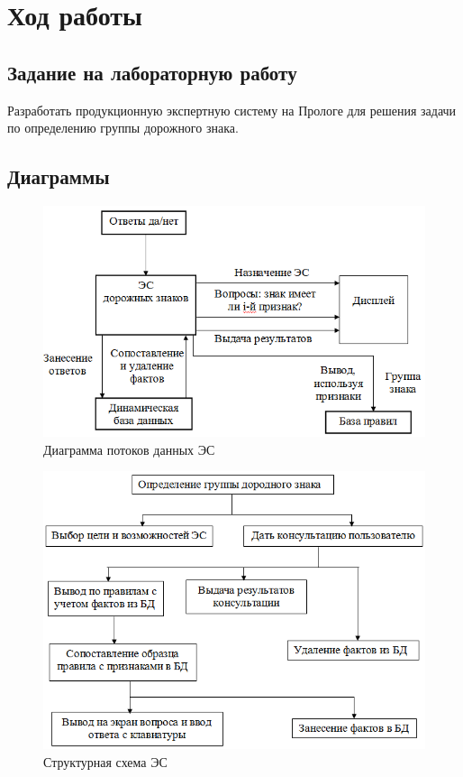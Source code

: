 \chapter{Ход работы}

\section{Задание на лабораторную работу}

Разработать продукционную экспертную систему на Прологе для решения
задачи по определению группы дорожного знака.

\section{Диаграммы}

\begin{figure}[H]
	\centering
	\includegraphics[width=1\linewidth]{fig/dataflow}
	\caption{Диаграмма потоков данных ЭС}
	\label{fig:dataflow}
\end{figure}

\begin{figure}[H]
	\centering
	\includegraphics[width=1\linewidth]{fig/scheme}
	\caption{Структурная схема ЭС}
	\label{fig:scheme}
\end{figure}

